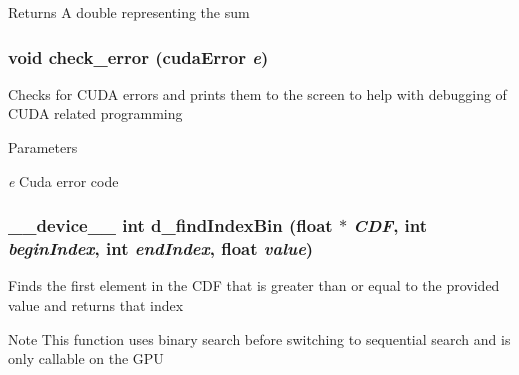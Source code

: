 \begin{DoxyReturn}{Returns}
A double representing the sum 
\end{DoxyReturn}
\hypertarget{ex__particle__CUDA__naive__full_8cu_a4a894e10d3ce85515e41ac09c7f052c3}{
\subsubsection[{check\_\-error}]{\setlength{\rightskip}{0pt plus 5cm}void check\_\-error (cudaError {\em e})}}
\label{ex__particle__CUDA__naive__full_8cu_a4a894e10d3ce85515e41ac09c7f052c3}
Checks for CUDA errors and prints them to the screen to help with debugging of CUDA related programming 
\begin{DoxyParams}{Parameters}
\item[{\em e}]Cuda error code \end{DoxyParams}
\hypertarget{ex__particle__CUDA__naive__full_8cu_a6ded92551e271ff186c6f08dbf3a8443}{
\subsubsection[{d\_\-findIndexBin}]{\setlength{\rightskip}{0pt plus 5cm}\_\-\_\-device\_\-\_\- int d\_\-findIndexBin (float $\ast$ {\em CDF}, \/  int {\em beginIndex}, \/  int {\em endIndex}, \/  float {\em value})}}
\label{ex__particle__CUDA__naive__full_8cu_a6ded92551e271ff186c6f08dbf3a8443}
Finds the first element in the CDF that is greater than or equal to the provided value and returns that index \begin{DoxyNote}{Note}
This function uses binary search before switching to sequential search and is only callable on the GPU 
\end{DoxyNote}

